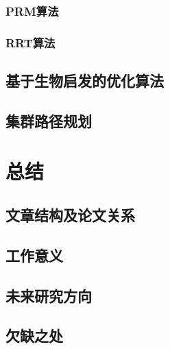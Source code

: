 \documentclass[conference]{IEEEtran}
\begin{document}
\subsubsection{PRM算法}

\subsubsection{RRT算法}


\subsection{基于生物启发的优化算法}


\subsection{集群路径规划}



\section{总结}


\subsection{文章结构及论文关系}


\subsection{工作意义}


\subsection{未来研究方向}


\subsection{欠缺之处}




\end{document}
